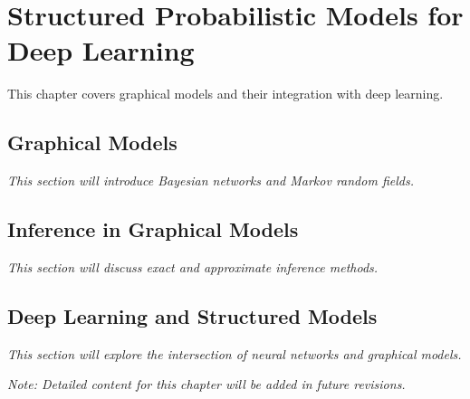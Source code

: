 
\chapter{Structured Probabilistic Models for Deep Learning}
\label{chap:structured-probabilistic-models}

This chapter covers graphical models and their integration with deep learning.

\section{Graphical Models}

\textit{This section will introduce Bayesian networks and Markov random fields.}

\section{Inference in Graphical Models}

\textit{This section will discuss exact and approximate inference methods.}

\section{Deep Learning and Structured Models}

\textit{This section will explore the intersection of neural networks and graphical models.}

\vspace{1em}
\noindent\textit{Note: Detailed content for this chapter will be added in future revisions.}
